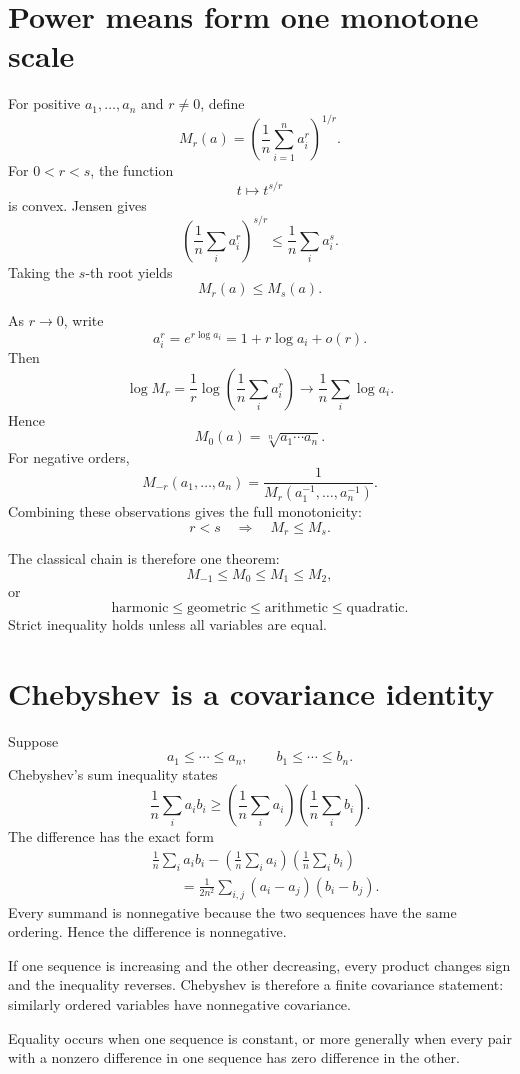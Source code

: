 \section{Power means form one monotone scale}

For positive \(a_1,\ldots,a_n\) and \(r\neq0\), define
\[
  M_r(a)
  =\left(\frac1n\sum_{i=1}^n a_i^r\right)^{1/r}.
\]
For \(0<r<s\), the function
\[
  t\longmapsto t^{s/r}
\]
is convex.  Jensen gives
\[
  \left(\frac1n\sum_i a_i^r\right)^{s/r}
  \le
  \frac1n\sum_i a_i^s.
\]
Taking the \(s\)-th root yields
\[
  M_r(a)\le M_s(a).
\]

As \(r\to0\), write
\[
  a_i^r=e^{r\log a_i}=1+r\log a_i+o(r).
\]
Then
\[
  \log M_r
  =\frac1r\log\left(\frac1n\sum_i a_i^r\right)
  \longrightarrow
  \frac1n\sum_i\log a_i.
\]
Hence
\[
  M_0(a)=\sqrt[n]{a_1\cdots a_n}.
\]
For negative orders,
\[
  M_{-r}(a_1,\ldots,a_n)
  =\frac1{M_r(a_1^{-1},\ldots,a_n^{-1})}.
\]
Combining these observations gives the full monotonicity:
\[
  r<s
  \quad\Longrightarrow\quad
  M_r\le M_s.
\]

The classical chain is therefore one theorem:
\[
  M_{-1}\le M_0\le M_1\le M_2,
\]
or
\[
  \text{harmonic}\le\text{geometric}\le\text{arithmetic}\le\text{quadratic}.
\]
Strict inequality holds unless all variables are equal.

\section{Chebyshev is a covariance identity}

Suppose
\[
  a_1\le\cdots\le a_n,
  \qquad
  b_1\le\cdots\le b_n.
\]
Chebyshev's sum inequality states
\[
  \frac1n\sum_i a_ib_i
  \ge
  \left(\frac1n\sum_i a_i\right)
  \left(\frac1n\sum_i b_i\right).
\]
The difference has the exact form
\[
\begin{aligned}
&\frac1n\sum_i a_ib_i
-\left(\frac1n\sum_i a_i\right)
 \left(\frac1n\sum_i b_i\right)\\
&\qquad=
\frac1{2n^2}
\sum_{i,j}(a_i-a_j)(b_i-b_j).
\end{aligned}
\]
Every summand is nonnegative because the two sequences have the same ordering.  Hence the difference is nonnegative.

If one sequence is increasing and the other decreasing, every product changes sign and the inequality reverses.  Chebyshev is therefore a finite covariance statement: similarly ordered variables have nonnegative covariance.

Equality occurs when one sequence is constant, or more generally when every pair with a nonzero difference in one sequence has zero difference in the other.

